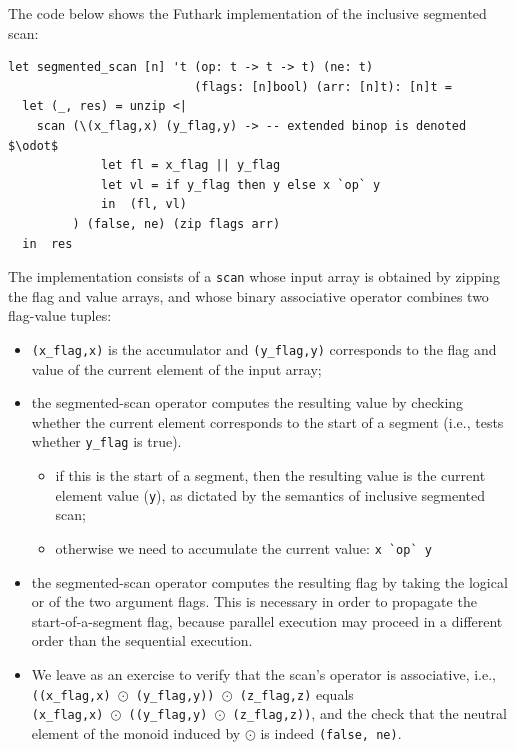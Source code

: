 \documentclass[acmsmall,review]{acmart}\settopmatter{printfolios=true,printccs=false,printacmref=false}
\begin{document}
The code below shows the Futhark implementation of the inclusive segmented scan:
\begin{lstlisting}[mathescape=true]
let segmented_scan [n] 't (op: t -> t -> t) (ne: t)
                          (flags: [n]bool) (arr: [n]t): [n]t =
  let (_, res) = unzip <|
    scan (\(x_flag,x) (y_flag,y) -> -- extended binop is denoted $\odot$
             let fl = x_flag || y_flag
             let vl = if y_flag then y else x `op` y
             in  (fl, vl)
         ) (false, ne) (zip flags arr)
  in  res
\end{lstlisting}\vspace{-2ex}
The implementation consists of a \lstinline{scan} whose
input array is obtained by zipping the flag and value arrays, and
whose binary associative operator combines two flag-value tuples:
\begin{itemize}
    \item {\tt (x\_flag,x)} is the accumulator and {\tt (y\_flag,y)} 
        corresponds to the flag and value of the current element of 
        the input array;
    \item  the segmented-scan operator computes the resulting value
        by checking whether the current element corresponds to the start
        of a segment (i.e., tests whether {\tt y\_flag} is true).
        \begin{itemize}
            \item if this is the start of a segment, then
                the resulting value is the current element
                value ({\tt y}), as dictated by the semantics
                of inclusive segmented scan;
            \item otherwise we need to accumulate the current
                value: \lstinline{x `op` y}
        \end{itemize}
    \item the segmented-scan operator computes the resulting flag
        by taking the logical or of the two argument flags. This is
        necessary in order to propagate the start-of-a-segment flag,
        because parallel execution may proceed in a different order
        than the sequential execution. 
    \item We leave as an exercise to verify that the scan's operator is 
        associative, i.e.,\\
        {\tt ((x\_flag,x) $\odot$ (y\_flag,y)) $\odot$ (z\_flag,z)} equals\\
        {\tt (x\_flag,x) $\odot$ ((y\_flag,y) $\odot$ (z\_flag,z))},
        and the check that the neutral element
        of the monoid induced by $\odot$ is indeed \lstinline{(false, ne)}.
\end{itemize}
\end{document}
